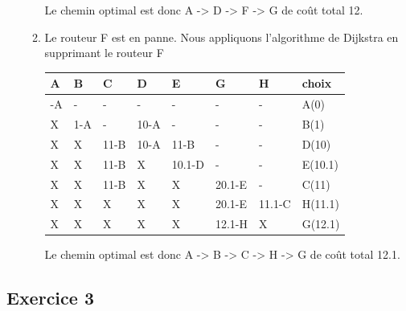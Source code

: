 \documentclass[
  letterpaper,
  DIV=11,
  numbers=noendperiod]{scrartcl}
\begin{document}
\begin{enumerate}
\begin{enumerate}
    Le chemin optimal est donc A -\textgreater{} D -\textgreater{} F
    -\textgreater{} G de coût total 12.
  \item
    Le routeur F est en panne. Nous appliquons l'algorithme de Dijkstra
    en supprimant le routeur F

    \begin{longtable}[]{@{}llllllll@{}}
    \toprule\noalign{}
    A & B & C & D & E & G & H & choix \\
    \midrule\noalign{}
    \endhead
    \bottomrule\noalign{}
    \endlastfoot
    0-A & - & - & - & - & - & - & A(0) \\
    X & 1-A & - & 10-A & - & - & - & B(1) \\
    X & X & 11-B & 10-A & 11-B & - & - & D(10) \\
    X & X & 11-B & X & 10.1-D & - & - & E(10.1) \\
    X & X & 11-B & X & X & 20.1-E & - & C(11) \\
    X & X & X & X & X & 20.1-E & 11.1-C & H(11.1) \\
    X & X & X & X & X & 12.1-H & X & G(12.1) \\
    \end{longtable}

    Le chemin optimal est donc A -\textgreater{} B -\textgreater{} C
    -\textgreater{} H -\textgreater{} G de coût total 12.1.
  \end{enumerate}
\end{enumerate}

\hypertarget{exercice-3}{%
\subsection{Exercice 3}\label{exercice-3}}
\end{document}
